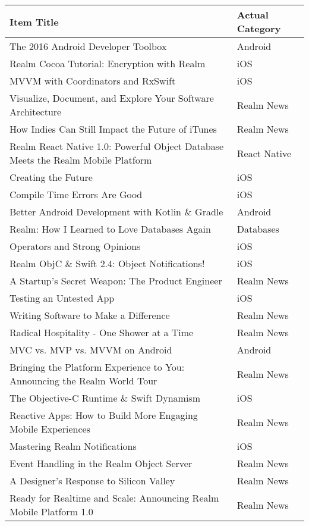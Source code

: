 \documentclass[letterpaper,11pt]{article}
\begin{document}
\begin{table}[h]
\centering
\begin{adjustbox}{max width=\linewidth}
\begin{tabular}{ | l | l |}
\hline
\textbf{Item Title} & \textbf{Actual Category} \\
\hline
%
The 2016 Android Developer Toolbox & Android \\ 
Realm Cocoa Tutorial: Encryption with Realm & iOS \\ 
MVVM with Coordinators and RxSwift & iOS \\ 
Visualize, Document, and Explore Your Software Architecture & Realm News \\ 
How Indies Can Still Impact the Future of iTunes & Realm News \\ 
Realm React Native 1.0: Powerful Object Database Meets the Realm Mobile Platform & React Native \\ 
Creating the Future & iOS \\ 
Compile Time Errors Are Good & iOS \\ 
Better Android Development with Kotlin \& Gradle & Android \\ 
Realm: How I Learned to Love Databases Again & Databases \\ 
Operators and Strong Opinions & iOS \\ 
Realm ObjC \& Swift 2.4: Object Notifications! & iOS \\ 
A Startup’s Secret Weapon: The Product Engineer & Realm News \\ 
Testing an Untested App & iOS \\ 
Writing Software to Make a Difference & Realm News \\ 
Radical Hospitality - One Shower at a Time & Realm News \\ 
MVC vs. MVP vs. MVVM on Android & Android \\ 
Bringing the Platform Experience to You: Announcing the Realm World Tour & Realm News \\ 
The Objective-C Runtime \& Swift Dynamism & iOS \\ 
Reactive Apps: How to Build More Engaging Mobile Experiences & Realm News \\ 
Mastering Realm Notifications & iOS \\ 
Event Handling in the Realm Object Server & Realm News \\ 
A Designer’s Response to Silicon Valley & Realm News \\ 
Ready for Realtime and Scale: Announcing Realm Mobile Platform 1.0 & Realm News \\ 

\end{tabular}
\end{adjustbox}
\end{table}
\end{document}
